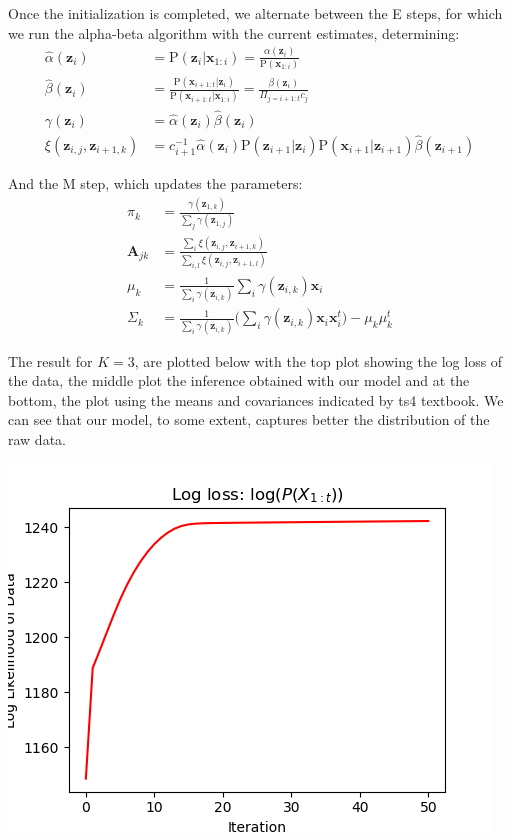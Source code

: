 \documentclass[12pt]{article}
\newcommand{\p}[1]{\mathrm{P}\left(#1 \right)}
\newcommand{\vect}[1]{\mathbf{#1}}
\newcommand{\matr}[1]{\bm{#1}}
\begin{document}
Once the initialization is completed, we alternate between the E steps, for which we run the alpha-beta algorithm with the current estimates, determining:
\begin{align*}
	\hat{\alpha}(\vect{z}_i)			&=	\p{\vect{z}_i | \vect{x}_{1:i}} 	=	\frac{\alpha(\vect{z}_i)} {\p{ \vect{x}_{1:i} }}	\\
	\hat{\beta}(\vect{z}_i)				&=	\frac{ \p{ \vect{x}_{i+1:t} | \vect{z}_i } }  {\p{ \vect{x}_{i+1:t} |  \vect{x}_{1:i}}}	= \frac{ \beta(\vect{z}_i) } {\Pi _{j=i+1:t} c_j} \\
	\gamma(\vect{z}_i)				&= 	\hat{\alpha}(\vect{z}_i) \hat{\beta}(\vect{z}_i)	\\
	\xi(\vect{z}_{i,j}, \vect{z}_{i+1,k})	&= 	c_{i+1}^{-1} \hat{\alpha}(\vect{z}_i) \p{\vect{z}_{i+1} | \vect{z}_i} \p{\vect{x}_{i+1} | \vect{z}_{i+1}} \hat{\beta}(\vect{z}_{i+1})	
\end{align*}

And the M step, which updates the parameters:
\begin{align*}
	\pi_k			&=	\frac{ \gamma(\vect{z}_{1,k}) } {\sum_j \gamma(\vect{z}_{1,j}) } \\
	\matr{A}_{jk}	&=	\frac{ \sum_i \xi(\vect{z}_{i,j} , \vect{z}_{i+1,k})}	{ \sum_{i,l} \xi(\vect{z}_{i,j} , \vect{z}_{i+1,l}) } \\
	\mu_k		&=	\frac{1} {\sum_i \gamma(\vect{z}_{i,k}) }  \sum_i \gamma(\vect{z}_{i,k}) \vect{x}_i \\
	\Sigma_k		&= 	\frac{1} {\sum_i \gamma(\vect{z}_{i,k}) }  \bigg(	\sum_i \gamma(\vect{z}_{i,k}) \vect{x}_i  \vect{x}_i^t	\bigg) - \mu_k \mu_k^t
\end{align*}

The result for $K=3$, are plotted below with the top plot showing the log loss of the data, the middle plot the inference obtained with our model and at the bottom, the plot using the means and covariances
indicated by ts4 textbook.  We can see that our model, to some extent, captures better the distribution of the raw data.

\begin{center}
	\includegraphics[width=1\linewidth]{figures/problem-3-2.png} 
\end{center}
\end{document}
